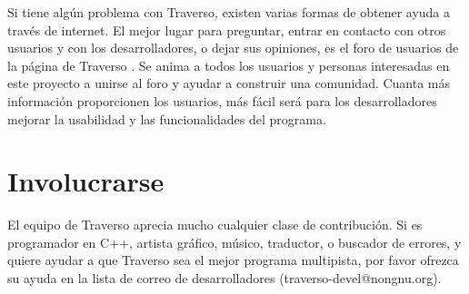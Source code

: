 Si tiene algún problema con Traverso, existen varias formas de obtener ayuda a través de internet. El mejor lugar para preguntar, entrar en contacto con otros usuarios y con los desarrolladores, o dejar sus opiniones, es el foro de usuarios de la página de Traverso \cite{forum}. Se anima a todos los usuarios y personas interesadas en este proyecto a unirse al foro y ayudar a construir una comunidad. Cuanta más información proporcionen los usuarios, más fácil será para los desarrolladores mejorar la usabilidad y las funcionalidades del programa.

\section{Involucrarse}
El equipo de Traverso aprecia mucho cualquier clase de contribución. Si es programador en C++, artista gráfico, músico, traductor, o buscador de errores, y quiere ayudar a que Traverso sea el mejor programa multipista, por favor ofrezca su ayuda en la lista de correo de desarrolladores (traverso-devel@nongnu.org).

